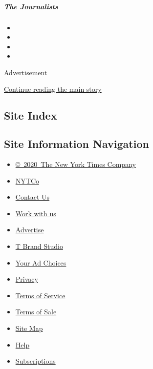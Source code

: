 \href{/interactive/2020/04/13/t-magazine/foreign-correspondents.html}{}

\hypertarget{the-journalists}{%
\subparagraph{The Journalists}\label{the-journalists}}

\begin{itemize}
\item
\item
\item
\item
\end{itemize}

Advertisement

\protect\hyperlink{after-bottom}{Continue reading the main story}

\hypertarget{site-index}{%
\subsection{Site Index}\label{site-index}}

\hypertarget{site-information-navigation}{%
\subsection{Site Information
Navigation}\label{site-information-navigation}}

\begin{itemize}
\tightlist
\item
  \href{https://help.nytimes.com/hc/en-us/articles/115014792127-Copyright-notice}{©~2020~The
  New York Times Company}
\end{itemize}

\begin{itemize}
\tightlist
\item
  \href{https://www.nytco.com/}{NYTCo}
\item
  \href{https://help.nytimes.com/hc/en-us/articles/115015385887-Contact-Us}{Contact
  Us}
\item
  \href{https://www.nytco.com/careers/}{Work with us}
\item
  \href{https://nytmediakit.com/}{Advertise}
\item
  \href{http://www.tbrandstudio.com/}{T Brand Studio}
\item
  \href{https://www.nytimes.com/privacy/cookie-policy\#how-do-i-manage-trackers}{Your
  Ad Choices}
\item
  \href{https://www.nytimes.com/privacy}{Privacy}
\item
  \href{https://help.nytimes.com/hc/en-us/articles/115014893428-Terms-of-service}{Terms
  of Service}
\item
  \href{https://help.nytimes.com/hc/en-us/articles/115014893968-Terms-of-sale}{Terms
  of Sale}
\item
  \href{https://spiderbites.nytimes.com}{Site Map}
\item
  \href{https://help.nytimes.com/hc/en-us}{Help}
\item
  \href{https://www.nytimes.com/subscription?campaignId=37WXW}{Subscriptions}
\end{itemize}
